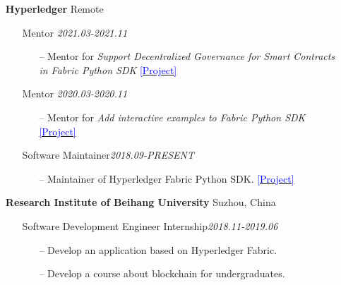 \documentclass[11pt]{article}
\begin{document}
\begin{itemize}[leftmargin=0em, noitemsep, nolistsep]
    \item[] \large\textbf{Hyperledger} \hfill Remote
        \begin{itemize}[noitemsep, nolistsep, leftmargin=0em]
            \item[] Mentor \hfill \textit{2021.03-2021.11}
            \begin{itemize}
                \small
                \item[--] Mentor for \textit{Support Decentralized Governance for Smart Contracts in Fabric Python SDK} \href{https://wiki.hyperledger.org/display/INTERN/Support+Decentralized+Governance+for+Smart+Contracts+in+Fabric+Python+SDK}{\textcolor{blue}{[Project]}}
            \end{itemize}
            \item[] Mentor \hfill \textit{2020.03-2020.11}
            \begin{itemize}
                \small
                \item[--] Mentor for \textit{Add interactive examples to Fabric Python SDK} \href{https://wiki.hyperledger.org/pages/viewpage.action?pageId=29035315}{\textcolor{blue}{[Project]}}
            \end{itemize}
            \item[] Software Maintainer\hfill \textit{2018.09-PRESENT}
             \begin{itemize}
                \small
                \item[--] Maintainer of Hyperledger Fabric Python SDK. \href{https://github.com/hyperledger/fabric-sdk-py}{\textcolor{blue}{[Project]}}
             \end{itemize}
        \end{itemize} 

    \item[] \large\textbf{Research Institute of Beihang University} \hfill Suzhou, China
        \begin{itemize}[noitemsep, nolistsep, leftmargin=0em]
            \item[] Software Development Engineer Internship\hfill \textit{2018.11-2019.06}
             \begin{itemize}
                \small
                \item[--] Develop an application based on Hyperledger Fabric.
                \item[--] Develop a course about blockchain for undergraduates.
             \end{itemize}
        \end{itemize}
\end{itemize}
\vspace{20mm} %
\end{document}
